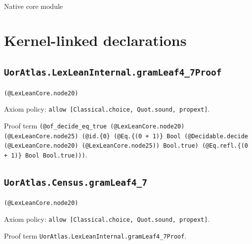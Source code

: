 \documentclass[11pt]{article}
\begin{document}
\begin{center}{\LARGE Native core module}\end{center}
\section*{Kernel-linked declarations}
\subsection*{\texttt{UorAtlas.LexLeanInternal.gramLeaf4\_7Proof}}
\noindent\texttt{(@LexLeanCore.node20)}\par
\noindent Axiom policy: \texttt{allow [Classical.choice, Quot.sound, propext]}.\par
\noindent Proof term \texttt{(@of\_decide\_eq\_true (@LexLeanCore.node20) (@LexLeanCore.node25) (@id.\{0\} (@Eq.\{(0 + 1)\} Bool (@Decidable.decide (@LexLeanCore.node20) (@LexLeanCore.node25)) Bool.true) (@Eq.refl.\{(0 + 1)\} Bool Bool.true)))}.\par
\subsection*{\texttt{UorAtlas.Census.gramLeaf4\_7}}
\noindent\texttt{(@LexLeanCore.node20)}\par
\noindent Axiom policy: \texttt{allow [Classical.choice, Quot.sound, propext]}.\par
\noindent Proof term \texttt{UorAtlas.LexLeanInternal.gramLeaf4\_7Proof}.\par
\end{document}
